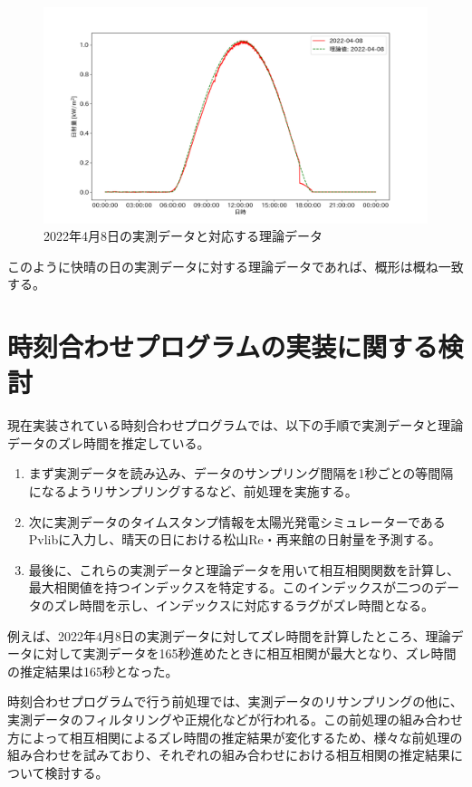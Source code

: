\documentclass[a4j,12pt,]{jarticle}
\begin{document}
\begin{figure}[H]
  \begin{center}
    \includegraphics[width=160mm]{real_and_theoretical.png}
    \caption{2022年4月8日の実測データと対応する理論データ}
    \label{p4}
  \end{center}
\end{figure}

このように快晴の日の実測データに対する理論データであれば、概形は概ね一致する。

\section{時刻合わせプログラムの実装に関する検討}
現在実装されている時刻合わせプログラムでは、以下の手順で実測データと理論データのズレ時間を推定している。

\begin{enumerate}
\item まず実測データを読み込み、データのサンプリング間隔を1秒ごとの等間隔になるようリサンプリングするなど、前処理を実施する。
\item 次に実測データのタイムスタンプ情報を太陽光発電シミュレーターであるPvlibに入力し、晴天の日における松山Re・再来館の日射量を予測する。
\item 最後に、これらの実測データと理論データを用いて相互相関関数を計算し、最大相関値を持つインデックスを特定する。このインデックスが二つのデータのズレ時間を示し、インデックスに対応するラグがズレ時間となる。
\end{enumerate}

例えば、2022年4月8日の実測データに対してズレ時間を計算したところ、理論データに対して実測データを165秒進めたときに相互相関が最大となり、ズレ時間の推定結果は165秒となった。

時刻合わせプログラムで行う前処理では、実測データのリサンプリングの他に、実測データのフィルタリングや正規化などが行われる。この前処理の組み合わせ方によって相互相関によるズレ時間の推定結果が変化するため、様々な前処理の組み合わせを試みており、それぞれの組み合わせにおける相互相関の推定結果について検討する。
\end{document}
